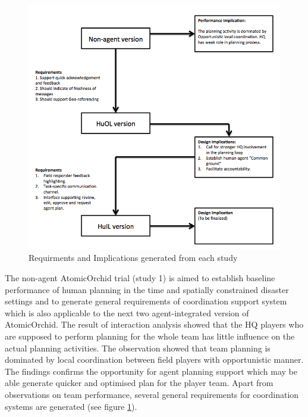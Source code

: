 \begin{figure}[h]
  \centering
  \includegraphics[width=1\textwidth]{img/conclusion/connections}
  \caption{Requirments and Implications generated from each study}
  \label{fig:connections}
\end{figure}

The non-agent AtomicOrchid trial (study 1) is aimed to establish baseline performance of human planning in the time and spatially constrained disaster settings and to generate general requirements of coordination support system which is also applicable to the next two agent-integrated version of AtomicOrchid. The result of interaction analysis showed that the HQ players who are supposed to perform planning for the whole team has little influence on the actual planning activities. The observation showed that team planning is dominated by local coordination between field players with opportunistic manner. The findings confirms the opportunity for agent planning support which may be able generate quicker and optimised plan for the player team. Apart from observations on team performance, several general requirements for coordination systems are generated (see figure \ref{fig:connections}).\\

